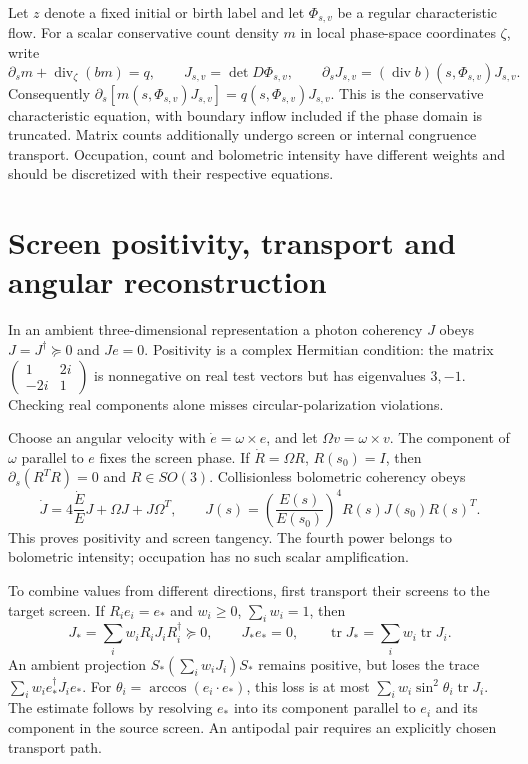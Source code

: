 Let $z$ denote a fixed initial or birth label and let $\Phi_{s,v}$ be a regular characteristic flow. For a scalar conservative count density $m$ in local phase-space coordinates $\zeta$, write
\begin{equation}
 \partial_sm+\operatorname{div}_\zeta(bm)=q,\qquad
 J_{s,v}=\det D\Phi_{s,v},\qquad
 \partial_sJ_{s,v}=(\operatorname{div}b)(s,\Phi_{s,v})J_{s,v}.
 \label{v:count_pullback}
\end{equation}
Consequently $\partial_s[m(s,\Phi_{s,v})J_{s,v}]=q(s,\Phi_{s,v})J_{s,v}$. This is the conservative characteristic equation, with boundary inflow included if the phase domain is truncated. Matrix counts additionally undergo screen or internal congruence transport. Occupation, count and bolometric intensity have different weights and should be discretized with their respective equations.

\section{Screen positivity, transport and angular reconstruction}
\label{v:screen}

In an ambient three-dimensional representation a photon coherency $J$ obeys
$J=J^\dagger\succeq0$ and $Je=0$. Positivity is a complex Hermitian condition: the matrix
$\left(\begin{smallmatrix}1&2i\\-2i&1\end{smallmatrix}\right)$ is nonnegative on real test vectors but has eigenvalues $3,-1$. Checking real components alone misses circular-polarization violations.

Choose an angular velocity with $\dot e=\omega\times e$, and let $\Omega v=\omega\times v$. The component of $\omega$ parallel to $e$ fixes the screen phase. If $\dot R=\Omega R$, $R(s_0)=I$, then $\partial_s(R^TR)=0$ and $R\in SO(3)$. Collisionless bolometric coherency obeys
\begin{equation}
 \dot J=4\frac{\dot E}{E}J+\Omega J+J\Omega^T,\qquad
 J(s)=\left(\frac{E(s)}{E(s_0)}\right)^4
 R(s)J(s_0)R(s)^T .
 \label{v:screen_congruence}
\end{equation}
This proves positivity and screen tangency. The fourth power belongs to bolometric intensity; occupation has no such scalar amplification.

To combine values from different directions, first transport their screens to the target screen. If $R_i e_i=e_*$ and $w_i\ge0$, $\sum_iw_i=1$, then
\begin{equation}
 J_*=\sum_iw_iR_iJ_iR_i^\dagger\succeq0,\qquad
 J_*e_*=0,\qquad \operatorname{tr}J_*=\sum_iw_i\operatorname{tr}J_i .
 \label{v:screen_interpolation}
\end{equation}
An ambient projection $S_*(\sum_iw_iJ_i)S_*$ remains positive, but loses the trace
$\sum_iw_i e_*^\dagger J_i e_*$. For $\theta_i=\arccos(e_i\cdot e_*)$, this loss is at most
$\sum_iw_i\sin^2\theta_i\operatorname{tr}J_i$. The estimate follows by resolving $e_*$ into its component parallel to $e_i$ and its component in the source screen. An antipodal pair requires an explicitly chosen transport path.

